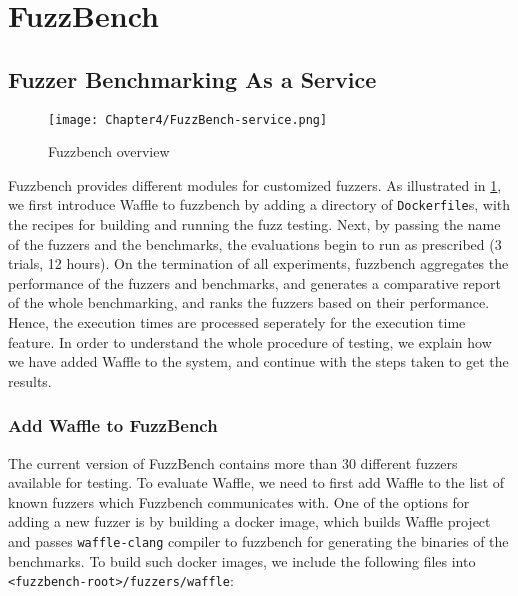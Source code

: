\section{FuzzBench}
\label{sec:ch4-fuzzbench}


\subsection{Fuzzer Benchmarking As a Service}

 \cite{metzman2020fuzzbench}

\begin{figure}[!t]
    \texttt{[image: Chapter4/FuzzBench-service.png]}
    \centering
    \caption{Fuzzbench overview}
    \label{fig:fuzzbench}
\end{figure}

Fuzzbench provides different modules for customized fuzzers. As illustrated in \ref{fig:fuzzbench}, we first introduce Waffle to fuzzbench by adding a directory of \texttt{Dockerfile}s, with the recipes for building and running the fuzz testing. Next, by passing the name of the fuzzers and the benchmarks, the evaluations begin to run as prescribed (3 trials, 12 hours). On the termination of all experiments, fuzzbench aggregates the performance of the fuzzers and benchmarks, and generates a comparative report of the whole benchmarking, and ranks the fuzzers based on their performance. Hence, the execution times are processed seperately for the execution time feature. In order to understand the whole procedure of testing, we explain how we have added Waffle to the system, and continue with the steps taken to get the results.


\subsubsection{Add Waffle to FuzzBench}

\begin{sloppypar}
The current version of FuzzBench contains more than 30 different fuzzers available for testing. To evaluate Waffle, we need to first add Waffle to the list of known fuzzers which Fuzzbench communicates with. One of the options for adding a new fuzzer is by building a docker image, which builds Waffle project and passes \texttt{waffle-clang} compiler to fuzzbench for generating the binaries of the benchmarks. To build such docker images, we include the following files into \texttt{<fuzzbench-root>/fuzzers/waffle}:
\end{sloppypar}

